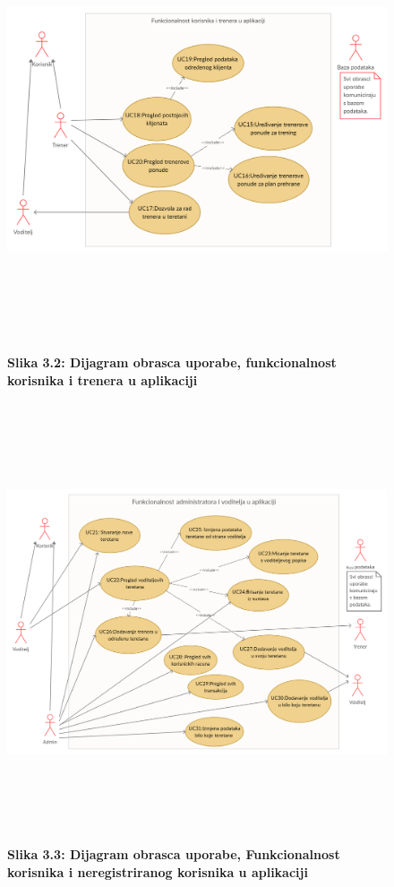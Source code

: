 				\begin{figure}
				\includegraphics[height= 13cm,width=1.2\textwidth]{slike/obrazac2.jpg}
				\textbf{Slika 3.2: Dijagram obrasca uporabe, funkcionalnost korisnika i trenera u aplikaciji}
				\end{figure}
				
				\begin{figure}
				\includegraphics[height= 13cm,width=1.2\textwidth]{slike/obrazac3.jpg}
				\textbf{Slika 3.3: Dijagram obrasca uporabe, Funkcionalnost korisnika i neregistriranog korisnika u aplikaciji}
				\end{figure}
				
